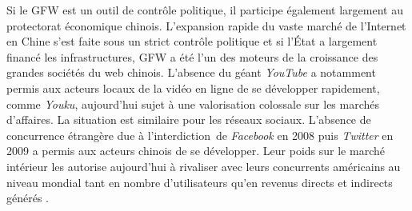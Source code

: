 Si le GFW est un outil de contrôle politique, il participe également largement au protectorat économique chinois. L’expansion rapide du vaste marché de l'Internet en Chine s’est faite sous un strict contrôle politique et si l’État a largement financé les infrastructures, GFW a été l’un des moteurs de la croissance des grandes sociétés du web chinois. L'absence du géant \textit{YouTube} a notamment permis aux acteurs locaux de la vidéo en ligne de se développer rapidement, comme \textit{Youku}, aujourd’hui sujet à une valorisation colossale sur les marchés d’affaires. La situation est similaire pour les réseaux sociaux. L'absence de concurrence étrangère due à l’interdiction de \textit{Facebook} en 2008 puis \textit{Twitter} en 2009 a permis aux acteurs chinois de se développer. Leur poids sur le marché intérieur les autorise aujourd’hui à rivaliser avec leurs concurrents américains au niveau mondial tant en nombre d’utilisateurs \citep{CIC2012} qu’en revenus directs et indirects générés \citep{CIW2012}.

